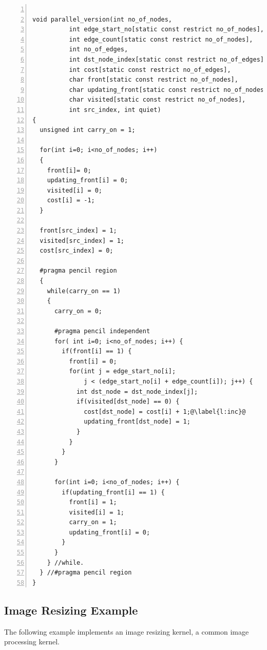 \documentclass{carp}
\begin{document}
\begin{lstlisting}[language=pencil,escapechar=@, numbers=left,numberstyle={\tiny\tt},numbersep=5pt]

void parallel_version(int no_of_nodes,
          int edge_start_no[static const restrict no_of_nodes],
          int edge_count[static const restrict no_of_nodes],
          int no_of_edges,
          int dst_node_index[static const restrict no_of_edges],
          int cost[static const restrict no_of_edges],
          char front[static const restrict no_of_nodes],
          char updating_front[static const restrict no_of_nodes],
          char visited[static const restrict no_of_nodes],
          int src_index, int quiet)
{
  unsigned int carry_on = 1;

  for(int i=0; i<no_of_nodes; i++)
  {
    front[i]= 0;
    updating_front[i] = 0;
    visited[i] = 0;
    cost[i] = -1;
  }

  front[src_index] = 1;
  visited[src_index] = 1;
  cost[src_index] = 0;

  #pragma pencil region
  {
    while(carry_on == 1)
    {
      carry_on = 0;

      #pragma pencil independent
      for( int i=0; i<no_of_nodes; i++) {
        if(front[i] == 1) {
          front[i] = 0; 
          for(int j = edge_start_no[i]; 
              j < (edge_start_no[i] + edge_count[i]); j++) {
            int dst_node = dst_node_index[j];
            if(visited[dst_node] == 0) {
              cost[dst_node] = cost[i] + 1;@\label{l:inc}@
              updating_front[dst_node] = 1;
            }
          }
        }
      }

      for(int i=0; i<no_of_nodes; i++) {
        if(updating_front[i] == 1) {
          front[i] = 1;
          visited[i] = 1;
          carry_on = 1;
          updating_front[i] = 0;
        }
      }  
    } //while.
  } //#pragma pencil region
}
\end{lstlisting}

\subsection{Image Resizing Example}

The following example implements an image resizing kernel,
a common image processing kernel.
\end{document}
